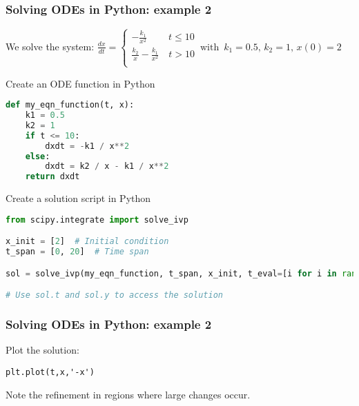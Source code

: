 \begin{frame}[fragile]
  \frametitle{Solving ODEs in Python: example 2}
  We solve the system: $\displaystyle \frac{dx}{dt} = \begin{cases}
    -\frac{k_1}{x^2} \quad\ \quad t \leq 10\\
    \frac{k_2}{x} - \frac{k_1}{x^2} \quad  t > 10\\
 \end{cases}\, \text{with }\, k_1 = 0.5,\, k_2 = 1,\, x(0) = 2$
 \vspace*{0ex}
  \begin{block}{Create an ODE function in Python}
    \begin{lstlisting}[language=Python,basicstyle=\tiny]
def my_eqn_function(t, x):
    k1 = 0.5
    k2 = 1
    if t <= 10:
        dxdt = -k1 / x**2
    else:
        dxdt = k2 / x - k1 / x**2
    return dxdt
\end{lstlisting}
  \end{block}
  \pause
  \begin{block}{Create a solution script in Python}
    \begin{lstlisting}[language=Python,basicstyle=\tiny]
from scipy.integrate import solve_ivp

x_init = [2]  # Initial condition
t_span = [0, 20]  # Time span

sol = solve_ivp(my_eqn_function, t_span, x_init, t_eval=[i for i in range(21)], rtol=1e-6, atol=1e-6)

# Use sol.t and sol.y to access the solution
\end{lstlisting}
  \end{block}
\vfill
\end{frame}


{\nologo
\begin{frame}[fragile]
  \frametitle{Solving ODEs in Python: example 2}
  Plot the solution:
  \begin{lstlisting}
plt.plot(t,x,'-x')
  \end{lstlisting}
  \pause
  \begin{center}
  \end{center}
  Note the refinement in regions where large changes occur.
\end{frame}
}

